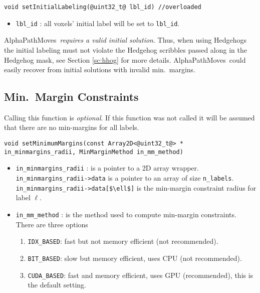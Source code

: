 \documentclass[12pt,letterpaper]{article}
\def\APM{{\ttfamily AlphaPathMoves}~}
\begin{document}
\begin{lstlisting}
void setInitialLabeling(@uint32_t@ lbl_id) //overloaded
\end{lstlisting}
\vspace{-2ex}
\begin{itemize}
\item \lstinline{lbl_id} : all voxels' initial label will be set to \lstinline{lbl_id}.
\end{itemize}

\begin{tcolorbox}
\APM {\em requires a valid initial solution}. Thus, when using Hedgehogs the initial labeling must not violate the Hedgehog scribbles passed along in the Hedgehog mask, see Section \ref{sc:hhog} for more details. \APM could easily recover from initial solutions with invalid min.~margins.
\end{tcolorbox}

\subsection{Min.~Margin Constraints}
Calling this function is {\em optional}. If this function was not called it will be assumed that there are no min-margins for all labels.
\begin{lstlisting}
void setMinimumMargins(const Array2D<@uint32_t@> * in_minmargins_radii, MinMarginMethod in_mm_method)
\end{lstlisting}
\vspace{-2ex}
\begin{itemize}
\item \lstinline{in_minmargins_radii} : is a pointer to a 2D array wrapper. \lstinline{in_minmargins_radii->data}  is a pointer to an array of size \lstinline[mathescape=true]{n_labels}.
    \lstinline[mathescape=true]{in_minmargins_radii->data[$\ell$]} is the min-margin constraint radius for label $\ell$.
\item \lstinline{in_mm_method} : is the method used to compute min-margin constraints.
There are three options
\begin{enumerate}
\item \lstinline{IDX_BASED}: fast but not memory efficient (not recommended).
\item \lstinline{BIT_BASED}: slow but memory efficient, uses CPU (not recommended).
\item \lstinline{CUDA_BASED}: fast and memory efficient, uses GPU (recommended), this is the default setting.
\end{enumerate}
\end{itemize}
\end{document}
